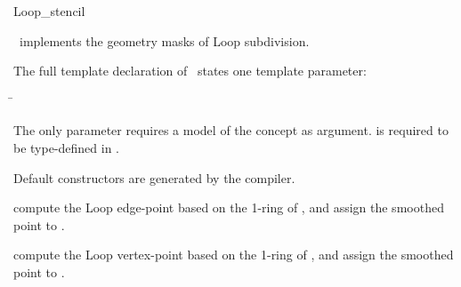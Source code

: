 \begin{ccRefClass}{Loop_stencil}

\ccDefinition

\ccClassTemplateName\ implements the geometry masks of Loop subdivision. 


\ccParameters

The full template declaration of \ccClassTemplateName\ states one
template parameter:

\begin{tabbing}
 \= 
\end{tabbing}
   
The only parameter requires a model of 
the  concept as argument. 
 is required to be type-defined in .

\ccCreation

Default constructors are generated by the compiler.

\ccThree{}{}{}

{compute the Loop edge-point based on the 1-ring of , 
and assign the smoothed point to .}

{compute the Loop vertex-point based on the 1-ring of , 
and assign the smoothed point to .}


\ccSeeAlso

\\
\\

\end{ccRefClass}

\ccRefPageEnd


